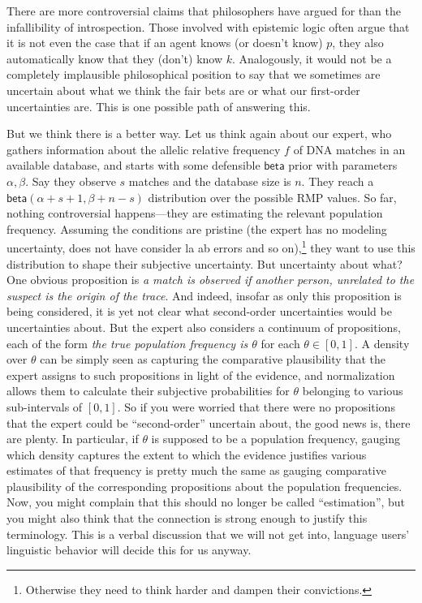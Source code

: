 \documentclass[
  10pt,
  dvipsnames,enabledeprecatedfontcommands]{scrartcl}
\newcommand{\s}[1]{\mbox{$\mathsf{#1}$}}
\begin{document}
There are more controversial claims that philosophers have argued for
than the infallibility of introspection. Those involved with epistemic
logic often argue that it is not even the case that if an agent knows
(or doesn't know) \(p\), they also automatically know that they (don't)
know \(k\). Analogously, it would not be a completely implausible
philosophical position to say that we sometimes are uncertain about what
we think the fair bets are or what our first-order uncertainties are.
This is one possible path of answering this.

But we think there is a better way. Let us think again about our expert,
who gathers information about the allelic relative frequency \(f\) of
DNA matches in an available database, and starts with some defensible
\s{beta} prior with parameters \(\alpha, \beta\). Say they observe \(s\)
matches and the database size is \(n\). They reach a
\(\s{beta}(\alpha + s + 1 ,\beta + n - s)\) distribution over the
possible RMP values. So far, nothing controversial happens---they are
estimating the relevant population frequency. Assuming the conditions
are pristine (the expert has no modeling uncertainty, does not have
consider la ab errors and so on),\footnote{Otherwise they need to think
  harder and dampen their convictions.} they want to use this
distribution to shape their subjective uncertainty. But uncertainty
about what? One obvious proposition is
\emph{a match is observed  if another person, unrelated to the suspect is the origin of the trace}.
And indeed, insofar as only this proposition is being considered, it is
yet not clear what second-order uncertainties would be uncertainties
about. But the expert also considers a continuum of propositions, each
of the form \emph{the true population frequency is $\theta$} for each
\(\theta\in [0,1]\). A density over \(\theta\) can be simply seen as
capturing the comparative plausibility that the expert assigns to such
propositions in light of the evidence, and normalization allows them to
calculate their subjective probabilities for \(\theta\) belonging to
various sub-intervals of \([0,1]\). So if you were worried that there
were no propositions that the expert could be ``second-order'' uncertain
about, the good news is, there are plenty. In particular, if \(\theta\)
is supposed to be a population frequency, gauging which density captures
the extent to which the evidence justifies various estimates of that
frequency is pretty much the same as gauging comparative plausibility of
the corresponding propositions about the population frequencies. Now,
you might complain that this should no longer be called ``estimation'',
but you might also think that the connection is strong enough to justify
this terminology. This is a verbal discussion that we will not get into,
language users' linguistic behavior will decide this for us anyway.
\end{document}
